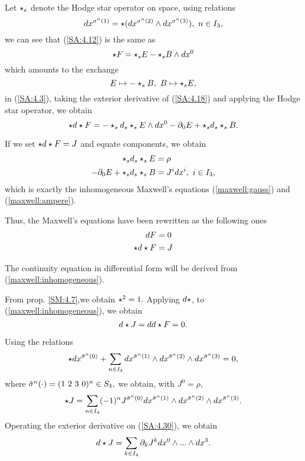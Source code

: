 Let $\star_{s}$ denote the Hodge star operator on space, using relations
\begin{equation}
 \label{SA:3.17}
dx^{\sigma^{n}(1)}=\star (dx^{\sigma^{n}(2)}\wedge dx^{\sigma^{n}(3)}), \ n\in I_{3},
\end{equation}
we can see that (\ref{SA:4.12}) is the same as 
\begin{equation}
 \label{SA:4.18}
\star F = \star_{s} E -\star_{s} B \wedge dx^{0}
\end{equation}
which amounts to the exchange
$$
E\mapsto - \star_{s} B, \ B \mapsto \star_{s} E,
$$
in (\ref{SA:4.3}), taking the exterior derivative of (\ref{SA:4.18}) and applying the Hodge star operator, we obtain
\begin{equation}
 \label{SA:4.20}
\star d \star F = - \star_{s} d_{s} \star_{s} E \wedge dx^{0} - \partial_{0}E + \star_{s} d_{s} \star_{s} B.
\end{equation}

If we set $\star d \star F = J$ and equate components, we obtain 
\begin{align}
 \star_{s} d_{s} \star_{s} E &= \rho \\
-\partial_{0} E + \star_{s} d_{s} \star_{s} B &= J^{i}dx^{i}, \ i \in I_{3},
\end{align}
which is exactly the inhomogeneous Maxwell's equations (\ref{maxwell:gauss}) and (\ref{maxwell:ampere}). 

Thus, the Maxwell's equations have been rewritten as the following ones
\begin{align}
 \label{maxwell:homogeneous}
dF &= 0 \\
\label{maxwell:inhomogeneous}
\star d \star F &= J
\end{align}



The continuity equation in differential form will be derived from (\ref{maxwell:inhomogeneous}).

From prop. \ref{SM:4.7},we obtain $\star^{2}=1.$ Applying $d \star$, to (\ref{maxwell:inhomogeneous}), we obtain 
\begin{equation}
 \label{SA:4.29}
d \star J = dd \star F = 0. 
\end{equation}

Using the relations
\begin{equation}
 \label{SA:3.23}
\star dx^{\tilde{\sigma}^{n}(0)} + \sum_{n \in I_{3}} dx^{\tilde{\sigma}^{n}(1)}\wedge dx^{\tilde{\sigma}^{n}(2)} \wedge dx^{\tilde{\sigma}^{n}(3)}= 0,
\end{equation}
where $\tilde{\sigma}^{n}(\cdot)=(1 \ 2 \ 3 \ 0)^{n} \in S_{4},$ we obtain, with $J^{0}=\rho,$
\begin{equation}
\label{SA:4.30}
 \star J = \sum_{n \in I_{4}} (-1)^{n} J^{\tilde{\sigma}^{n}(0)} dx^{\tilde{\sigma}^{n}(1)} \wedge dx^{\tilde{\sigma}^{n}(2)} \wedge dx^{\tilde{\sigma}^{n}(3)}. 
\end{equation}
Operating the exterior derivative on (\ref{SA:4.30}), we obtain
\begin{equation}
 \label{SA:4.32}
d \star J = \sum_{k \in I_{4}} \partial_{k}J^{k} dx^{0}\wedge...\wedge dx^{3}.
\end{equation}

